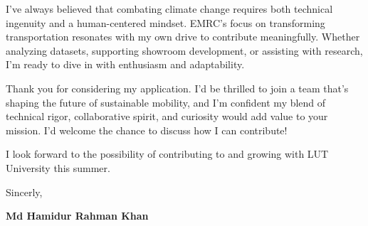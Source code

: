 \documentclass[12pt]{article}
\newcommand{\firstname}{Md Hamidur Rahman Khan}
\newlength{\spacebox}
\newcommand{\svspace}{\vspace*{0.5em}}
\newcommand{\signature}{
    \svspace
    \parbox{3\spacebox}{
      Sincerly,\par
      \svspace \hspace{-0.3em}
      \textbf{\color{black} \firstname}\par
      \svspace \svspace
    }\par
}
\begin{document}
{I’ve always believed that combating climate change requires both technical ingenuity and a human-centered mindset. EMRC’s focus on transforming transportation resonates with my own drive to contribute meaningfully. Whether analyzing datasets, supporting showroom development, or assisting with research, I’m ready to dive in with enthusiasm and adaptability.

Thank you for considering my application. I’d be thrilled to join a team that’s shaping the future of sustainable mobility, and I’m confident my blend of technical rigor, collaborative spirit, and curiosity would add value to your mission. I’d welcome the chance to discuss how I can contribute!
}{I look forward to the possibility of contributing to and growing with LUT University this summer.}
\signature
\end{document}

